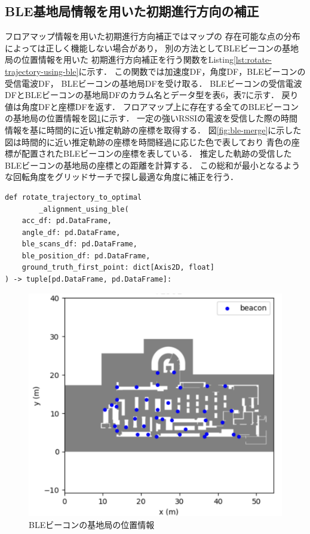 

\subsection{BLE基地局情報を用いた初期進行方向の補正}

フロアマップ情報を用いた初期進行方向補正ではマップの
存在可能な点の分布によっては正しく機能しない場合があり，
別の方法としてBLEビーコンの基地局の位置情報を用いた
初期進行方向補正を行う関数をListing\ref{lst:rotate-trajectory-using-ble}に示す．
この関数では加速度DF，角度DF，BLEビーコンの受信電波DF， BLEビーコンの基地局DFを受け取る．
BLEビーコンの受信電波DFとBLEビーコンの基地局DFのカラム名とデータ型を表6，表7に示す．
戻り値は角度DFと座標DFを返す．
フロアマップ上に存在する全てのBLEビーコンの基地局の位置情報を図\ref{fig:ble-beacon-position}に示す．
一定の強いRSSIの電波を受信した際の時間情報を基に時間的に近い推定軌跡の座標を取得する．
図\ref{fig:ble-merge}に示した図は時間的に近い推定軌跡の座標を時間経過に応じた色で表しており
青色の座標が配置されたBLEビーコンの座標を表している．
推定した軌跡の受信したBLEビーコンの基地局の座標との距離を計算する．
この総和が最小となるような回転角度をグリッドサーチで探し最適な角度に補正を行う．

\begin{lstlisting}[caption={BLEビーコンの基地局の位置情報を\\使用した初期進行方向補正}, label=lst:rotate-trajectory-using-ble]
def rotate_trajectory_to_optimal
		_alignment_using_ble(
    acc_df: pd.DataFrame,
    angle_df: pd.DataFrame,
    ble_scans_df: pd.DataFrame,
    ble_position_df: pd.DataFrame,
    ground_truth_first_point: dict[Axis2D, float]
) -> tuple[pd.DataFrame, pd.DataFrame]:
\end{lstlisting}


\begin{figure}[ht]
	\centering
	\includegraphics[width=\linewidth]{image/ble-beacon-position.jpg}
	\caption{BLEビーコンの基地局の位置情報}    \label{fig:ble-beacon-position}
\end{figure}

